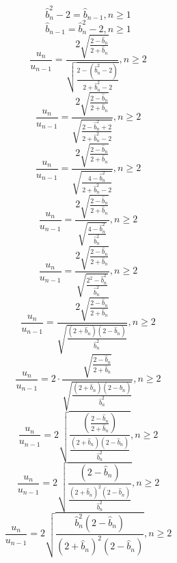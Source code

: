 \documentclass[a4paper,12pt]{report}
\begin{document}
\begin{equation}
\hat{b}_n^2 - 2 = \hat{b}_{n-1}, n \geq 1
\end{equation}
\begin{equation}
\hat{b}_{n-1} = \hat{b}_n^2 - 2, n \geq 1
\end{equation}
\begin{equation}
\frac{u_n}{u_{n-1}} = \frac{2 \sqrt{\frac{2 - \hat{b}_n}{2 + \hat{b}_n}}}{\sqrt{\frac{2 - (\hat{b}_n^2 - 2)}{2 + \hat{b}_n^2 - 2}}}, n \geq 2
\end{equation}
\begin{equation}
\frac{u_n}{u_{n-1}} = \frac{2 \sqrt{\frac{2 - \hat{b}_n}{2 + \hat{b}_n}}}{\sqrt{\frac{2 - \hat{b}_n^2 + 2}{2 + \hat{b}_n^2 - 2}}}, n \geq 2
\end{equation}
\begin{equation}
\frac{u_n}{u_{n-1}} = \frac{2 \sqrt{\frac{2 - \hat{b}_n}{2 + \hat{b}_n}}}{\sqrt{\frac{4 - \hat{b}_n^2}{2 + \hat{b}_n^2 - 2}}}, n \geq 2
\end{equation}
\begin{equation}
\frac{u_n}{u_{n-1}} = \frac{2 \sqrt{\frac{2 - \hat{b}_n}{2 + \hat{b}_n}}}{\sqrt{\frac{4 - \hat{b}_n^2}{\hat{b}_n^2}}}, n \geq 2
\end{equation}
\begin{equation}
\frac{u_n}{u_{n-1}} = \frac{2 \sqrt{\frac{2 - \hat{b}_n}{2 + \hat{b}_n}}}{\sqrt{\frac{2^2 - \hat{b}_n^2}{\hat{b}_n^2}}}, n \geq 2
\end{equation}
\begin{equation}
\frac{u_n}{u_{n-1}} = \frac{2 \sqrt{\frac{2 - \hat{b}_n}{2 + \hat{b}_n}}}{\sqrt{\frac{(2 + \hat{b}_n) (2 - \hat{b}_n)}{\hat{b}_n^2}}}, n \geq 2
\end{equation}
\begin{equation}
\frac{u_n}{u_{n-1}} = 2 \cdot \frac{\sqrt{\frac{2 - \hat{b}_n}{2 + \hat{b}_n}}}{\sqrt{\frac{(2 + \hat{b}_n) (2 - \hat{b}_n)}{\hat{b}_n^2}}}, n \geq 2
\end{equation}
\begin{equation}
\frac{u_n}{u_{n-1}} = 2 \sqrt{\frac{\left(\frac{2 - \hat{b}_n}{2 + \hat{b}_n}\right)}{\frac{(2 + \hat{b}_n) (2 - \hat{b}_n)}{\hat{b}_n^2}}}, n \geq 2
\end{equation}
\begin{equation}
\frac{u_n}{u_{n-1}} = 2 \sqrt{\frac{(2 - \hat{b}_n)}{\frac{(2 + \hat{b}_n)^2 (2 - \hat{b}_n)}{\hat{b}_n^2}}}, n \geq 2
\end{equation}
\begin{equation}
\frac{u_n}{u_{n-1}} = 2 \sqrt{\frac{\hat{b}_n^2 (2 - \hat{b}_n)}{(2 + \hat{b}_n)^2 (2 - \hat{b}_n)}}, n \geq 2
\end{equation}
\end{document}
